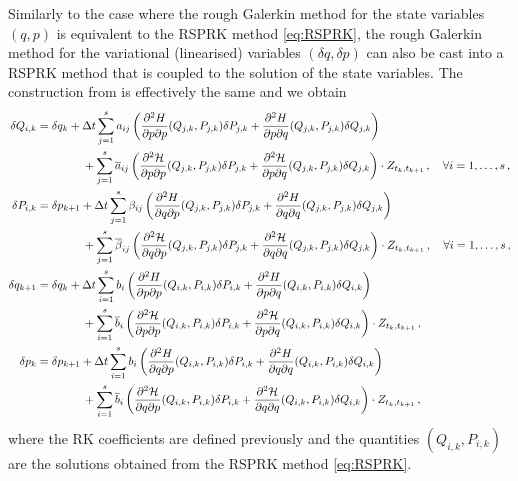 \documentclass[11pt, oneside]{article}
\numberwithin{equation}{section}
\theoremstyle{definition}
\newcommand{\ob}[1]{\overline{#1}}
\newcommand{\mc}[1]{\mathcal{#1}}
\newcommand{\mcal}[1]{\mc{#1}}
\def\p{{\partial}}
\def\p{\partial}
\begin{document}
Similarly to the case where the rough Galerkin method for the state variables $(q,p)$ is equivalent to the RSPRK method \eqref{eq:RSPRK}, the rough Galerkin method for the variational (linearised) variables $(\delta q, \delta p)$ can also be cast into a RSPRK method that is coupled to the solution of the state variables. The construction from is effectively the same and we obtain
\begin{subequations}\label{eq: var RSPRK}
    \begin{align}
    \delta Q_{i,k} &= \delta q_k + \Delta t \sum_{j=1}^s a_{ij} \left(\frac{\p^2H}{\p p \p p}(Q_{j,k}, P_{j,k})\delta P_{j,k} + \frac{\p^2H}{\p p \p q}(Q_{j,k}, P_{j,k})\delta Q_{j,k} \right) \notag\\
    & \qquad \qquad + \sum_{j=1}^s \ob{a}_{ij}\left(\frac{\p^2\mcal{H}}{\p p \p p}(Q_{j,k}, P_{j,k})\delta P_{j,k} + \frac{\p^2\mcal{H}}{\p p \p q}(Q_{j,k}, P_{j,k})\delta Q_{j,k} \right)\cdot Z_{t_k, t_{k+1}}\,,\quad \forall i = 1,\ldots,s\,,\\
    \delta P_{i,k} &= \delta p_{k+1} + \Delta t \sum_{j=1}^s \beta_{ij} \left(\frac{\p^2 H}{\p q \p p}(Q_{j,k}, P_{j,k})\delta P_{j,k} + \frac{\p^2 H}{\p q \p q}(Q_{j,k}, P_{j,k})\delta Q_{j,k}\right) \notag\\
    &\qquad \qquad + \sum_{j=1}^s \ob{\beta}_{ij}\left(\frac{\p^2 \mcal{H}}{\p q \p p}(Q_{j,k}, P_{j,k})\delta P_{j,k} + \frac{\p^2 \mcal{H}}{\p q \p q}(Q_{j,k}, P_{j,k})\delta Q_{j,k}\right)\cdot Z_{t_k, t_{k+1}}\,,\quad \forall i = 1,\ldots,s\,,\\
    \delta q_{k+1} &= \delta q_k + \Delta t \sum_{i=1}^s b_i \left(\frac{\p^2H}{\p p \p p}(Q_{i,k}, P_{i,k})\delta P_{i,k} + \frac{\p^2H}{\p p \p q}(Q_{i,k}, P_{i,k})\delta Q_{i,k} \right) \notag\\ 
    &\qquad \qquad + \sum_{i=1}^s \ob{b}_i\left(\frac{\p^2\mcal{H}}{\p p \p p}(Q_{i,k}, P_{i,k})\delta P_{i,k} + \frac{\p^2\mcal{H}}{\p p \p q}(Q_{i,k}, P_{i,k})\delta Q_{i,k} \right)\cdot Z_{t_k, t_{k+1}}\,,\\
    \delta p_k &= \delta p_{k+1} + \Delta t \sum_{i=1}^s b_i \left(\frac{\p^2 H}{\p q \p p}(Q_{i,k}, P_{i,k})\delta P_{i,k} + \frac{\p^2 H}{\p q \p q}(Q_{i,k}, P_{i,k})\delta Q_{i,k}\right) \notag\\
    &\qquad \qquad + \sum_{i=1}^s \ob{b}_i\left(\frac{\p^2 \mcal{H}}{\p q \p p}(Q_{i,k}, P_{i,k})\delta P_{i,k} + \frac{\p^2 \mcal{H}}{\p q \p q}(Q_{i,k}, P_{i,k})\delta Q_{i,k}\right)\cdot Z_{t_k, t_{k+1}}\,,
    \end{align}
\end{subequations}
where the RK coefficients are defined previously and the quantities $(Q_{i,k}, P_{i,k})$ are the solutions obtained from the RSPRK method \eqref{eq:RSPRK}. 
\end{document}

